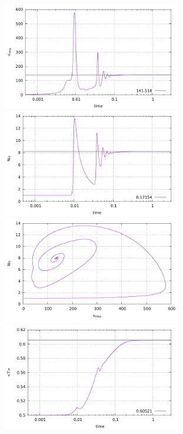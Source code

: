 \begin{center}
\includegraphics[width=7.8cm]{python_codes/fieldstone_28/results_case2/vrms.pdf}
\includegraphics[width=7.8cm]{python_codes/fieldstone_28/results_case2/Nu.pdf}\\
\includegraphics[width=7.8cm]{python_codes/fieldstone_28/results_case2/vrms_Nu.pdf}
\includegraphics[width=7.8cm]{python_codes/fieldstone_28/results_case2/Tavrg.pdf}
\end{center}

